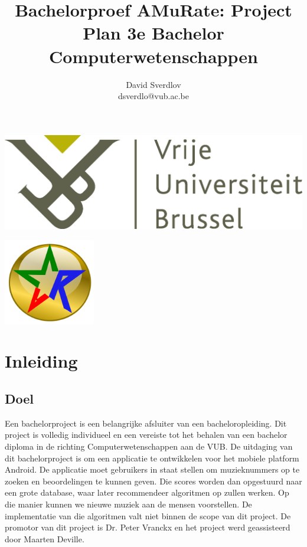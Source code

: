 \documentclass[11pt,a4paper]{article}
\author{David Sverdlov \\ dsverdlo@vub.ac.be}
\title{Bachelorproef AMuRate: Project Plan 3e Bachelor Computerwetenschappen}
\begin{document}
\begin{flushleft}
\noindent \includegraphics[width=0.6\linewidth]{Pictures/vub_logo.jpg} 
\end{flushleft}
{\let\newpage\relax\maketitle} %

\begin{center}
\includegraphics[width=4cm]{Pictures/amr_gold_thick.png} 
\end{center}



\newpage
\tableofcontents

\newpage
\section{Inleiding} 
\label{sec:Inleiding}

	\subsection{Doel} 
	\label{sec:Doel}
Een bachelorproject is een belangrijke afsluiter van een bacheloropleiding. Dit project is volledig individueel en een vereiste tot het behalen van een bachelor diploma in de richting Computerwetenschappen aan de VUB. De uitdaging van dit bachelorproject is om een applicatie te ontwikkelen voor het mobiele platform Android. De applicatie moet gebruikers in staat stellen om muzieknummers op te zoeken en beoordelingen te kunnen geven. Die scores worden dan opgestuurd naar een grote database, waar later recommendeer algoritmen op zullen werken. Op die manier kunnen we nieuwe muziek aan de mensen voorstellen. De implementatie van die algoritmen valt niet binnen de scope van dit project. De promotor van dit project is Dr. Peter Vranckx en het project werd geassisteerd door Maarten Deville.
\end{document}
